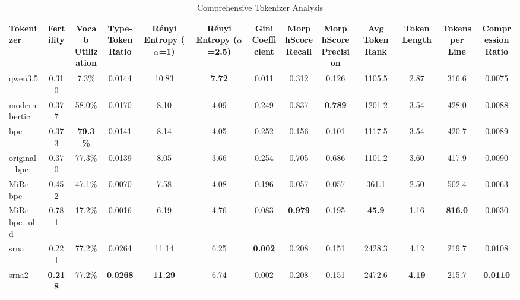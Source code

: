 \begin{table}[htbp]
\centering
\caption{Comprehensive Tokenizer Analysis}
\label{tab:comprehensive_metrics}
\begin{tabular}{lcccccccccccc}
\toprule
Tokenizer & Fertility & \makecell{Vocab \\ Utilization} & \makecell{Type-Token \\ Ratio} & \makecell{Rényi Entropy \\ ($\alpha$=1)} & \makecell{Rényi Entropy \\ ($\alpha$=2.5)} & \makecell{Gini \\ Coefficient} & \makecell{MorphScore \\ Recall} & \makecell{MorphScore \\ Precision} & Avg Token Rank & Token Length & Tokens per Line & \makecell{Compression \\ Ratio} \\
\midrule
qwen3.5 & 0.310 & 7.3\% & 0.0144 & 10.83 & \textbf{7.72} & 0.011 & 0.312 & 0.126 & 1105.5 & 2.87 & 316.6 & 0.0075 \\
modernbertic & 0.377 & 58.0\% & 0.0170 & 8.10 & 4.09 & 0.249 & 0.837 & \textbf{0.789} & 1201.2 & 3.54 & 428.0 & 0.0088 \\
bpe & 0.373 & \textbf{79.3\%} & 0.0141 & 8.14 & 4.05 & 0.252 & 0.156 & 0.101 & 1117.5 & 3.54 & 420.7 & 0.0089 \\
original\_bpe & 0.370 & 77.3\% & 0.0139 & 8.05 & 3.66 & 0.254 & 0.705 & 0.686 & 1101.2 & 3.60 & 417.9 & 0.0090 \\
MiRe\_bpe & 0.452 & 47.1\% & 0.0070 & 7.58 & 4.08 & 0.196 & 0.057 & 0.057 & 361.1 & 2.50 & 502.4 & 0.0063 \\
MiRe\_bpe\_old & 0.781 & 17.2\% & 0.0016 & 6.19 & 4.76 & 0.083 & \textbf{0.979} & 0.195 & \textbf{45.9} & 1.16 & \textbf{816.0} & 0.0030 \\
srna & 0.221 & 77.2\% & 0.0264 & 11.14 & 6.25 & \textbf{0.002} & 0.208 & 0.151 & 2428.3 & 4.12 & 219.7 & 0.0108 \\
srna2 & \textbf{0.218} & 77.2\% & \textbf{0.0268} & \textbf{11.29} & 6.74 & 0.002 & 0.208 & 0.151 & 2472.6 & \textbf{4.19} & 215.7 & \textbf{0.0110} \\
\bottomrule
\end{tabular}
\end{table}
